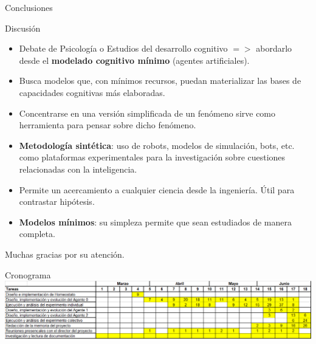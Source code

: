 \documentclass[aspectratio=169]{beamer}
\begin{document}
\begin{frame}{Conclusiones}
\begin{block}{Discusión}
  \vspace{-0.2cm}
  \begin{itemize}
    \item Debate de Psicología o Estudios del desarrollo cognitivo $=>$ abordarlo desde el \textbf{modelado cognitivo mínimo} (agentes artificiales).
    \item Busca modelos que, con mínimos recursos, puedan materializar las bases de capacidades cognitivas más elaboradas.
    \item Concentrarse en una versión simplificada de un fenómeno sirve como herramienta para pensar sobre dicho fenómeno.
    \item \textbf{Metodología sintética}: uso de robots, modelos de simulación, bots, etc. como plataformas experimentales para la investigación sobre cuestiones relacionadas con la inteligencia.
    \item Permite un acercamiento a cualquier ciencia desde la ingeniería. Útil para contrastar hipótesis.
    \item \textbf{Modelos mínimos}: su simpleza permite que sean estudiados de manera completa.
  \end{itemize}
\end{block}
\end{frame}

{
\begin{frame}[standout]
  Muchas gracias por su atención.
\end{frame}
}

\begin{frame}[fragile]{Cronograma}
  \includegraphics[width=1.0\textwidth,height=.45\textheight]{Imagenes/Cronograma}
\end{frame}
\end{document}
